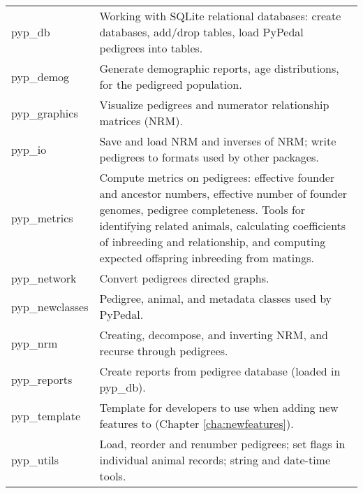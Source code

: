 \begin{center}
    \tablelasttail{\hline}
    \label{tbl:pypedal-modules}
    \begin{xtabular}{lp{4in}}
	pyp\_db & \parbox[t]{4in}{Working with SQLite relational databases: create databases, add/drop tables, load PyPedal pedigrees into tables.} \\
	pyp\_demog & \parbox[t]{4in}{Generate demographic reports, age distributions, for the pedigreed population.} \\
	pyp\_graphics & \parbox[t]{4in}{Visualize pedigrees and numerator relationship matrices (NRM).} \\
	pyp\_io & \parbox[t]{4in}{Save and load NRM and inverses of NRM; write pedigrees to formats used by other packages.} \\
	pyp\_metrics & \parbox[t]{4in}{Compute metrics on pedigrees: effective founder and ancestor numbers, effective number of founder genomes, pedigree completeness.  Tools for identifying related animals, calculating coefficients of inbreeding and relationship, and computing expected offspring inbreeding from matings.} \\
	pyp\_network & \parbox[t]{4in}{Convert pedigrees directed graphs.} \\
	pyp\_newclasses & \parbox[t]{4in}{Pedigree, animal, and metadata classes used by PyPedal.} \\
	pyp\_nrm & \parbox[t]{4in}{Creating, decompose, and inverting NRM, and recurse through pedigrees.} \\
	pyp\_reports & \parbox[t]{4in}{Create reports from pedigree database (loaded in pyp_db).} \\
	pyp\_template & \parbox[t]{4in}{Template for developers to use when adding new features to \PyPedal{} (Chapter \ref{cha:newfeatures}).} \\
	pyp\_utils & \parbox[t]{4in}{Load, reorder and renumber pedigrees; set flags in individual animal records; string and date-time tools.} \\
    \end{xtabular}
\end{center}







